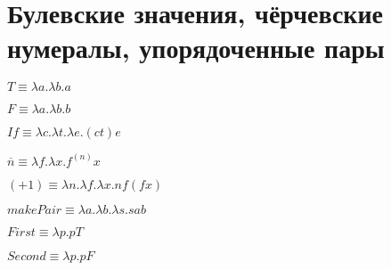\documentclass[10pt,a4paper,oneside]{article}
\theoremstyle{plain}
\theoremstyle{defenition}
\begin{document}
\section{Булевские значения, чёрчевские нумералы, упорядоченные пары}

$T\equiv\lambda a.\lambda b.a$

$F\equiv\lambda a.\lambda b.b$

$If\equiv\lambda c.\lambda t.\lambda e.(c t) e$

$\overline{n}\equiv\lambda f.\lambda x.f^{(n)} x$

$(+1)\equiv\lambda n.\lambda f.\lambda x.n f (f x)$

$makePair\equiv\lambda a.\lambda b.\lambda s.s a b$

$First\equiv\lambda p.p T$

$Second\equiv\lambda p.p F$
\end{document}
